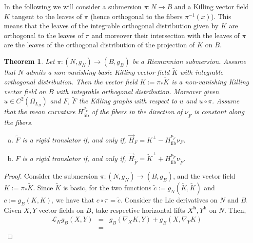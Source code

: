 \documentclass[12pt]{article}
\newtheorem{theorem}[lemma]{Theorem}
\numberwithin{lemma}{section}
\newcommand{\R}{\mathbb{R}}
\newcommand{\h}{\mathbf{h}}
\begin{document}
{In the following we will consider a submersion $\pi:N\rightarrow B$ and a Killing vector field $K$ tangent to the leaves of $\pi$ (hence orthogonal to the fibers $\pi^{-1}(x)$). This means that the leaves of the integrable orthogonal distribution given by $K$ are orthogonal to the leaves of $\pi$ and moreover their intersection with the leaves of $\pi$ are the leaves of the orthogonal distribution of the projection of $K$ on $B$.

\begin{theorem}\label{submersions_and_Rigid_sol}
Let $\pi:(N,g_N)\rightarrow (B,g_B)$ be a Riemannian submersion. Assume that 
$N$ admits a non-vanishing basic Killing vector field $\widetilde{K}$  with integrable orthogonal distribution. Then the vector field $K:=\pi_*{\widetilde{K}}$ is a non-vanishing Killing vector field on $B$ with integrable orthogonal distribution. Moreover %
given $u \in C^2(\Omega_{L_B})$ and $F$, $\widetilde{F}$ the Killing graphs with respect to $u$ and
$u \circ \pi$. Assume that the mean curvature $H_{\mathrm{fib}}^{\nu_{\widetilde{F}}}$ of the fibers in the direction of $\nu_{\widetilde{F}}$ is constant along the fibers. 
\begin{enumerate}[a)]
\item $\tilde{F}$ is a rigid translator if, and only if, $\vec{H}_{F}=K^{\perp}- H_{\mathrm{fib}}^{\nu_{\widetilde{F}}} \nu_{F}$.
\item $F$ is a rigid translator if, and only if, 
$\vec{H}_{\widetilde{F}}=\tilde{K}^{\perp}+H_{\mathrm{fib}}^{\nu_{\widetilde{F}}} \nu_{\widetilde{F}}$.
\end{enumerate}
\end{theorem} 
\begin{proof}
Consider the submersion $\pi:(N,g_N)\rightarrow (B,g_B)$,  
and the vector field $K:=\pi_*\widetilde{K}$. Since $\widetilde{K}$ is basic,  for the two functions $\widetilde{c}:=g_N(\widetilde{K},\widetilde{K})$ and $c:=g_B(K,K)$, we have that $c\circ \pi=\tilde{c}$. Consider the Lie derivatives on $N$ and $B$. Given $X,Y$ vector fields on $B$, take respective horizontal lifts $X^{\h},Y^{\h}$ on $N$. Then, \begin{eqnarray*}\mathcal{L}_Kg_B(X,Y)&=&g_B(\nabla_XK,Y)+g_B(X,\nabla_YK)\\&=& 

\end{eqnarray*}
\end{proof}}
\end{document}
